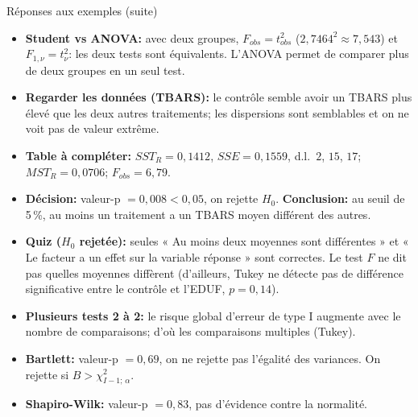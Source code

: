\documentclass{BeamerTemplate}
\begin{document}
\begin{frame}[t]{Réponses aux exemples (suite)}

\scriptsize
\begin{itemize}\itemsep1mm
  \item \textbf{Student vs ANOVA:} avec deux groupes, $F_{obs}=t_{obs}^2$
  ($2{,}7464^2\approx7{,}543$) et $F_{1,\nu}=t_\nu^2$: les deux tests sont équivalents.
  L'ANOVA permet de comparer plus de deux groupes en un seul test.
  \item \textbf{Regarder les données (TBARS):} le contrôle semble avoir un TBARS plus
  élevé que les deux autres traitements; les dispersions sont semblables et on ne voit
  pas de valeur extrême.
  \item \textbf{Table à compléter:} $SST_R=0{,}1412$, $SSE=0{,}1559$, d.l.\ $2$, $15$,
  $17$; $MST_R=0{,}0706$; $F_{obs}=6{,}79$.
  \item \textbf{Décision:} valeur-p $=0{,}008<0{,}05$, on rejette $H_0$.
  \textbf{Conclusion:} au seuil de 5\,\%, au moins un traitement a un TBARS moyen
  différent des autres.
  \item \textbf{Quiz ($H_0$ rejetée):} seules « Au moins deux moyennes sont
  différentes » et « Le facteur a un effet sur la variable réponse » sont correctes.
  Le test $F$ ne dit pas \alert{quelles} moyennes diffèrent (d'ailleurs, Tukey ne
  détecte pas de différence significative entre le contrôle et l'EDUF, $p=0{,}14$).
  \item \textbf{Plusieurs tests 2 à 2:} le risque global d'erreur de type I augmente
  avec le nombre de comparaisons; d'où les comparaisons multiples (Tukey).
  \item \textbf{Bartlett:} valeur-p $=0{,}69$, on ne rejette pas l'égalité des
  variances. On rejette si $B>\chi^2_{I-1;\,\alpha}$.
  \item \textbf{Shapiro-Wilk:} valeur-p $=0{,}83$, pas d'évidence contre la normalité.
\end{itemize}

\end{frame}
\end{document}

